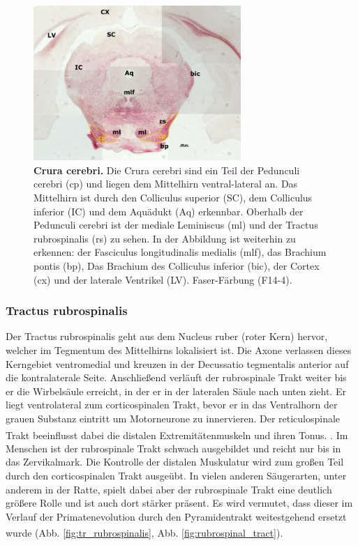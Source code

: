 \documentclass[12pt,a4paper,pdftex]{article}
\begin{document}
\begin{figure}[H]
    \centering
    \includegraphics[width=0.7\textwidth]{pictures/Bilder_Laura/cerebral_peduncle_F14_4P_025x.png}
    \caption[Crura cerebri]{\textbf{Crura cerebri.} Die Crura cerebri sind ein Teil der Pedunculi cerebri (cp) und liegen dem Mittelhirn ventral-lateral an. Das Mittelhirn ist durch den Colliculus superior (SC), dem Colliculus inferior (IC) und dem Aquädukt (Aq) erkennbar. Oberhalb der Pedunculi cerebri ist der mediale Leminiscus (ml) und der Tractus rubrospinalis (rs) zu sehen. In der Abbildung ist weiterhin zu erkennen: der Fasciculus longitudinalis medialis (mlf), das Brachium pontis (bp), Das Brachium des Colliculus inferior (bic), der Cortex (cx) und der laterale Ventrikel (LV). Faser-Färbung (F14-4).}
    \label{fig:crura_cerebri}
\end{figure}

\subsubsection{Tractus rubrospinalis} 
Der Tractus rubrospinalis geht aus dem Nucleus ruber (roter Kern) hervor, welcher im Tegmentum des Mittelhirns lokalisiert ist. Die Axone verlassen dieses Kerngebiet ventromedial und kreuzen in der Decussatio tegmentalis anterior auf die kontralaterale Seite. Anschließend verläuft der rubrospinale Trakt weiter bis er die Wirbelsäule erreicht, in der er in der lateralen Säule nach unten zieht. Er liegt ventrolateral zum corticospinalen Trakt, bevor er in das Ventralhorn der grauen Substanz eintritt um Motorneurone zu innervieren. Der reticulospinale Trakt beeinflusst dabei die distalen Extremitätenmuskeln und ihren Tonus.  \textsuperscript{\cite[8]{crossman2014neuroanatomy}}. Im Menschen ist der rubrospinale Trakt schwach ausgebildet und reicht nur bis in das Zervikalmark. Die Kontrolle der distalen Muskulatur wird zum großen Teil durch den corticospinalen Trakt ausgeübt. In vielen anderen Säugerarten, unter anderem in der Ratte, spielt dabei aber der rubrospinale Trakt eine deutlich größere Rolle und ist auch dort stärker präsent. Es wird vermutet, dass dieser im Verlauf der Primatenevolution durch den Pyramidentrakt weitestgehend ersetzt wurde \textsuperscript{\cite[14]{neurowissenschaften_baer}} (Abb. \ref{fig:tr_rubrospinalis}, Abb. \ref{fig:rubrospinal_tract}).    
\end{document}
